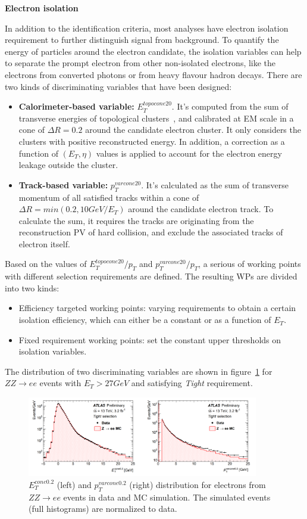 \textbf{Electron isolation}

In addition to the identification criteria, most analyses have electron isolation requirement to further distinguish signal from background.
To quantify the energy of particles around the electron candidate, the isolation variables can help to separate the prompt electron from other non-isolated electrons, like the electrons from converted photons or from heavy flavour hadron decays.
There are two kinds of discriminating variables that have been designed:
\begin{itemize}
	\item \textbf{Calorimeter-based variable:} $E_{T}^{topocone20}$. 
        It's computed from the sum of transverse energies of topological clusters~\cite{Aad:2016upy}, and calibrated at EM scale in a cone of $\Delta R = 0.2$ around the candidate electron cluster. 
        It only considers the clusters with positive reconstructed energy. In addition, a correction as a function of $(E_{T}, \eta)$ values is applied to account for the electron energy leakage outside the cluster.
	\item \textbf{Track-based variable:} $p_{T}^{varcone20}$. It's calculated as the sum of transverse momentum of all satisfied tracks within a cone of $\Delta R = min(0.2, 10 GeV/E_{T})$ around the candidate electron track. To calculate the sum, it requires the tracks are originating from the reconstruction PV of hard collision, and exclude the associated tracks of electron itself.
\end{itemize}
Based on the values of $E_{T}^{topocone20}/p_{T}$ and $p_{T}^{varcone20}/p_{T}$, a serious of working points with different selection requirements are defined.
The resulting WPs are divided into two kinds:
\begin{itemize}
	\item Efficiency targeted working points: varying requirements to obtain a certain isolation efficiency, which can either be a constant or as a function of $E_{T}$.
	\item Fixed requirement working points: set the constant upper thresholds on isolation variables.
\end{itemize}
The distribution of two discriminating variables are shown in figure~\ref{fig:ele_iso} for $ZZ \rightarrow ee$ events with $E_{T} > 27 GeV$ and satisfying \textit{Tight} requirement.
\begin{figure}[!htb]
  \centering
  \includegraphics[width=0.9\textwidth]{figures/Simulation/ele_iso.png}
  \caption{$E_{T}^{cone0.2}$ (left) and $p_{T}^{varcone0.2}$ (right) distribution for electrons from $ZZ \rightarrow ee$ events in data and MC simulation. The simulated events (full histograms) are normalized to data.}
  \label{fig:ele_iso}
\end{figure}

